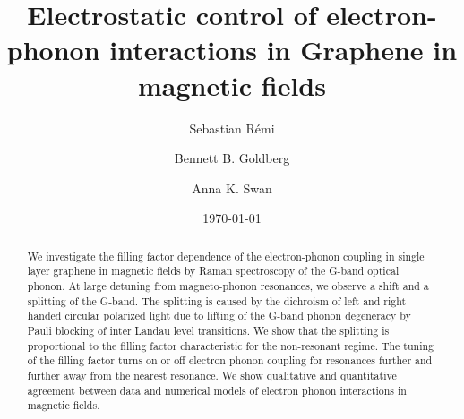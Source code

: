 \documentclass[prl,aps,superscriptaddress,showpacs,reprint]{revtex4-1}
\begin{document}
\title{Electrostatic control of electron-phonon interactions in Graphene in magnetic fields} %

\author{Sebastian R\'{e}mi}

\author{Bennett B. Goldberg}


\author{Anna K. Swan}

\date{\today}

\begin{abstract}
We investigate the filling factor dependence of the electron-phonon coupling in single layer graphene in magnetic fields by Raman spectroscopy of the G-band optical phonon. At large detuning from magneto-phonon resonances, we observe a shift and a splitting of the G-band. The splitting is caused by the dichroism of left and right handed circular polarized light due to lifting of the G-band phonon degeneracy by Pauli blocking of inter Landau level transitions. We show that the splitting is proportional to the filling factor characteristic for the non-resonant regime. The tuning of the filling factor turns on or off electron phonon coupling for resonances further and further away from the nearest resonance.  We show qualitative and quantitative agreement between data and numerical models of electron phonon interactions in magnetic fields.
\end{abstract}




\maketitle %
\end{document}
